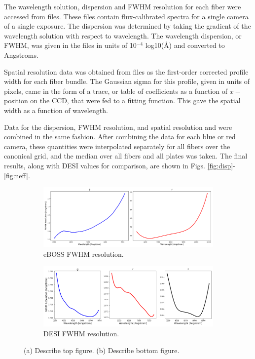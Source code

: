 The wavelength solution, dispersion and FWHM resolution for each fiber were accessed from  files. These files contain flux-calibrated spectra for a single camera of a single exposure. The dispersion was determined by taking the gradient of the wavelength solution with respect to wavelength. The wavelength dispersion, or FWHM, was given in the files in units of 10$^{-4}$ log10($\mbox{\AA}$) and converted to Angstroms.

Spatial resolution data was obtained from  files as the first-order corrected profile width for each fiber bundle. The Gaussian sigma for this profile, given in units of pixels, came in the form of a trace, or table of coefficients as a function of $x-$position on the CCD, that were fed to a fitting function. This gave the spatial width as a function of wavelength.

Data for the dispersion, FWHM resolution, and spatial resolution and were combined in the same fashion. After combining the data for each blue or red camera, these quantities were interpolated separately for all fibers over the canonical grid, and the median over all fibers and all plates was taken. The final results, along with DESI values for comparison, are shown in Figs. \ref{fig:disp}-\ref{fig:neff}.


\begin{figure}[h]
\centering
\begin{subfigure}[b]{0.55\textwidth}
   \includegraphics[width=14cm]{images/specsim/eboss_resolution.png}
   \caption{eBOSS FWHM resolution.}
   \label{fig:eboss_fwhm} 
\label{fig:fwhm}
\end{subfigure}

\begin{subfigure}[b]{0.55\textwidth}
   \includegraphics[width=14cm]{images/specsim/desi_resolution.png}
   \caption{DESI FWHM resolution.}
   \label{fig:desi_fwhm}
\end{subfigure}
\caption[Two numerical solutions]{(a) Describe top figure. (b) Describe bottom figure.}
\end{figure}


